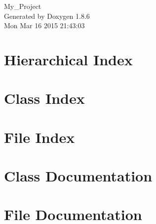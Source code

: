 \documentclass[twoside]{book}
\newcommand{\clearemptydoublepage}{%
  \newpage{\pagestyle{empty}\cleardoublepage}%
}
\begin{document}
\hypersetup{pageanchor=false}
\begin{titlepage}
\vspace*{7cm}
\begin{center}%
{\Large My\-\_\-\-Project }\\
\vspace*{1cm}
{\large Generated by Doxygen 1.8.6}\\
\vspace*{0.5cm}
{\small Mon Mar 16 2015 21:43:03}\\
\end{center}
\end{titlepage}
\clearemptydoublepage
\tableofcontents
\clearemptydoublepage
{}
\hypersetup{pageanchor=true}

\chapter{Hierarchical Index}

\chapter{Class Index}

\chapter{File Index}

\chapter{Class Documentation}
















\chapter{File Documentation}































\newpage
{}
{}
\printindex
\end{document}
